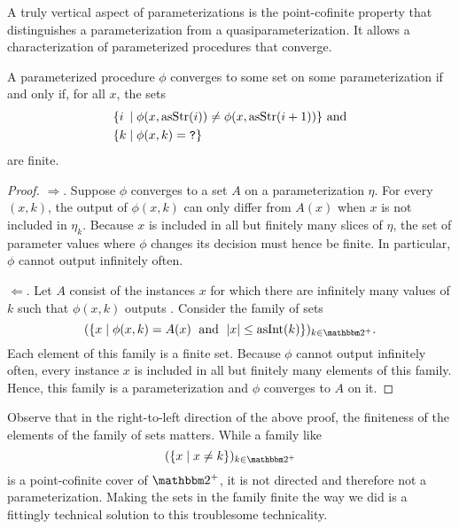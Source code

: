A truly vertical aspect of parameterizations is the point-cofinite property that distinguishes a parameterization from a quasiparameterization.
It allows a characterization of parameterized procedures that converge.
\begin{lemma}
\label{lem:convergent_finite}%
  A parameterized procedure $\phi$ converges to some set on some parameterization if and only if, for all $x$, the sets
  \begin{align*}
    &\{\mathrlap{i}\phantom{k} \st \phi(x, \asStr(i)) \neq \phi(x, \asStr(i + 1))\}\text{ and} \\
    &\{k \st \phi(x, k) = \bits{?}\}
  \end{align*}
  are finite.
\end{lemma}
\begin{proof}
  $\Longrightarrow$.
  Suppose $\phi$ converges to a set $A$ on a parameterization $\eta$.
  For every $(x, k)$, the output of $\phi(x, k)$ can only differ from $A(x)$ when $x$ is not included in $\eta_k$.
  Because $x$ is included in all but finitely many slices of $\eta$, the set of parameter values where $\phi$ changes its decision must hence be finite.
  In particular, $\phi$ cannot output  infinitely often.

  $\Longleftarrow$.
  Let $A$ consist of the instances $x$ for which there are infinitely many values of $k$ such that $\phi(x, k)$ outputs .
  Consider the family of sets
  \begin{equation*}
    (\{x \st \phi(x, k) = A(x) \reland \length{x} \le \asNat(k)\})_{k \in \binary^+}.
  \end{equation*}
  Each element of this family is a finite set.
  Because $\phi$ cannot output  infinitely often, every instance $x$ is included in all but finitely many elements of this family.
  Hence, this family is a parameterization and $\phi$ converges to $A$ on it.
\end{proof}

Observe that in the right-to-left direction of the above proof, the finiteness of the elements of the family of sets matters.
While a family like
\begin{equation*}
  (\{x \st x \neq k\})_{k \in \binary^+}
\end{equation*}
is a point-cofinite cover of $\binary^+$, it is not directed and therefore not a parameterization.
Making the sets in the family finite the way we did is a fittingly technical solution to this troublesome technicality.

